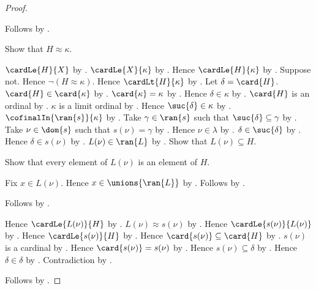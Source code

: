 \begin{proof}
\begin{subproof}
\begin{subproof}
\begin{byCase}
\begin{byCase}
                    \end{byCase}
            \end{byCase}
        \end{subproof}
        Follows by .
    \end{subproof}
    Show that $H\approx\kappa$.
    \begin{subproof}
        $\cardLe{H}{X}$ by .
        $\cardLe{X}{\kappa}$ by .
        Hence $\cardLe{H}{\kappa}$ by
            .
        Suppose not.
        Hence $\lnot(H\approx\kappa)$.
        Hence $\cardLt{H}{\kappa}$ by .
        Let $\delta=\card{H}$.
        $\card{H}\in\card{\kappa}$ by
            .
        $\card{\kappa}=\kappa$ by .
        Hence $\delta\in\kappa$ by \auto.
        $\card{H}$ is an ordinal by .
        $\kappa$ is a limit ordinal by
            .
        Hence $\suc{\delta}\in\kappa$ by .
        $\cofinalIn{\ran{s}}{\kappa}$ by
            .
        Take $\gamma\in\ran{s}$ such that
            $\suc{\delta}\subseteq\gamma$ by .
        Take $\nu\in\dom{s}$ such that $s(\nu)=\gamma$ by
            .
        Hence $\nu\in\lambda$ by \auto.
        $\delta\in\suc{\delta}$ by .
        Hence $\delta\in s(\nu)$ by .
        $L(\nu)\in\ran{L}$ by .
        Show that $L(\nu)\subseteq H$.
        \begin{subproof}
            Show that every element of $L(\nu)$ is an element of $H$.
            \begin{subproof}
                Fix $x\in L(\nu)$.
                Hence $x\in\unions{\ran{L}}$ by .
                Follows by \auto.
            \end{subproof}
            Follows by .
        \end{subproof}
        Hence $\cardLe{L(\nu)}{H}$ by
            .
        $L(\nu)\approx s(\nu)$ by \auto.
        Hence $\cardLe{s(\nu)}{L(\nu)}$ by
            .
        Hence $\cardLe{s(\nu)}{H}$ by
            .
        Hence $\card{s(\nu)}\subseteq\card{H}$ by
            .
        $s(\nu)$ is a cardinal by
            .
        Hence $\card{s(\nu)}=s(\nu)$ by .
        Hence $s(\nu)\subseteq\delta$ by \auto.
        Hence $\delta\in\delta$ by .
        Contradiction by .
    \end{subproof}
    Follows by \auto.
\end{proof}

